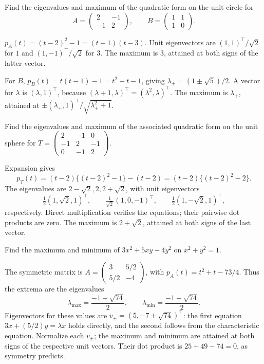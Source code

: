 \begin{problem}\label{ex:09:circle}
Find the eigenvalues and maximum of the quadratic form on the unit
circle for
\[
 A=\begin{pmatrix}2&-1\\-1&2\end{pmatrix},\qquad
 B=\begin{pmatrix}1&1\\1&0\end{pmatrix}.
\]
\end{problem}
\begin{solution}
\(p_A(t)=(t-2)^2-1=(t-1)(t-3)\).
Unit eigenvectors are \((1,1)^\top/\sqrt2\) for \(1\) and
\((1,-1)^\top/\sqrt2\) for \(3\).
The maximum is \(3\), attained at both signs of the latter vector.

For \(B\), \(p_B(t)=t(t-1)-1=t^2-t-1\), giving
\(\lambda_\pm=(1\pm\sqrt5)/2\).
A vector for \(\lambda\) is \((\lambda,1)^\top\), because
\((\lambda+1,\lambda)^\top=(\lambda^2,\lambda)^\top\).
The maximum is \(\lambda_+\), attained at
\(\pm(\lambda_+,1)^\top/\sqrt{\lambda_+^2+1}\).
\end{solution}

\begin{problem}\label{ex:09:sphere-example}
Find the eigenvalues and maximum of the associated quadratic form on
the unit sphere for
\(T=\begin{pmatrix}2&-1&0\\-1&2&-1\\0&-1&2\end{pmatrix}\).
\end{problem}
\begin{solution}
Expansion gives
\[
 p_T(t)=(t-2)\{(t-2)^2-1\}-(t-2)
       =(t-2)\{(t-2)^2-2\}.
\]
The eigenvalues are \(2-\sqrt2,2,2+\sqrt2\), with unit eigenvectors
\[
 \tfrac12(1,\sqrt2,1)^\top,\qquad
 \tfrac1{\sqrt2}(1,0,-1)^\top,\qquad
 \tfrac12(1,-\sqrt2,1)^\top,
\]
respectively. Direct multiplication verifies the equations; their
pairwise dot products are zero.
The maximum is \(2+\sqrt2\), attained at both signs of the last vector.
\end{solution}

\begin{problem}\label{ex:09:mixed-form}
Find the maximum and minimum of \(3x^2+5xy-4y^2\) on \(x^2+y^2=1\).
\end{problem}
\begin{solution}
The symmetric matrix is
\(A=\begin{pmatrix}3&5/2\\5/2&-4\end{pmatrix}\), with
\(p_A(t)=t^2+t-73/4\).
Thus the extrema are the eigenvalues
\[
 \lambda_{\max}=\frac{-1+\sqrt{74}}2,\qquad
 \lambda_{\min}=\frac{-1-\sqrt{74}}2 .
\]
Eigenvectors for these values are
\(v_\pm=(5,-7\pm\sqrt{74})^\top\):
the first equation \(3x+(5/2)y=\lambda x\) holds directly, and the
second follows from the characteristic equation.
Normalize each \(v_\pm\); the maximum and minimum are attained at both
signs of the respective unit vectors. Their dot product is
\(25+49-74=0\), as symmetry predicts.
\end{solution}

